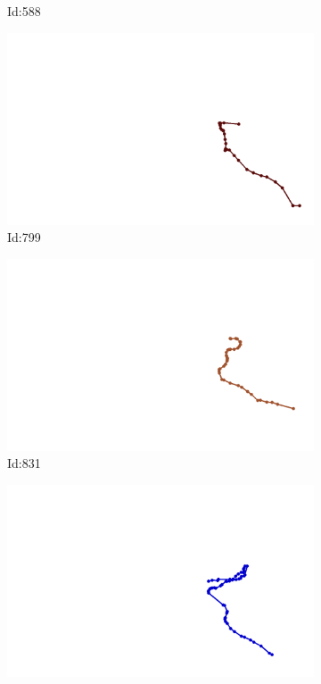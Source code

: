 \documentclass[12pt,twoside]{report}
\begin{document}
\begin{figure}
\begin{subfigure}[b]{0.20\textwidth}
\caption{Id:588}
\end{subfigure}
\begin{subfigure}[b]{0.20\textwidth}
\centering
\includegraphics[width=\textwidth]{../../trajectories/799.png}
\caption{Id:799}
\end{subfigure}
\begin{subfigure}[b]{0.20\textwidth}
\centering
\includegraphics[width=\textwidth]{../../trajectories/831.png}
\caption{Id:831}
\end{subfigure}
\begin{subfigure}[b]{0.20\textwidth}
\centering
\includegraphics[width=\textwidth]{../../trajectories/896.png}

\end{subfigure}
\end{figure}
\end{document}
